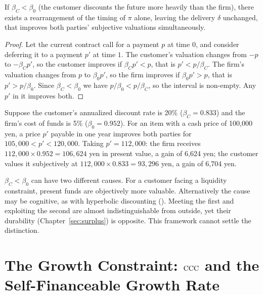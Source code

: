 \begin{proposition}
\label{prop:discount}
If $\beta_C<\beta_0$ (the customer discounts the future more heavily than the firm), there
exists a rearrangement of the timing of $\pi$ alone, leaving the delivery $\delta$ unchanged,
that improves both parties' subjective valuations simultaneously.
\end{proposition}

\begin{proof}
Let the current contract call for a payment $p$ at time $0$, and consider deferring it to a
payment $p'$ at time $1$. The customer's valuation changes from $-p$ to $-\beta_C p'$, so
the customer improves if $\beta_C p' < p$, that is $p' < p/\beta_C$. The firm's valuation
changes from $p$ to $\beta_0 p'$, so the firm improves if $\beta_0 p' > p$, that is
$p' > p/\beta_0$. Since $\beta_C<\beta_0$ we have $p/\beta_0 < p/\beta_C$, so the interval
is non-empty. Any $p'$ in it improves both.
\end{proof}

\begin{example}
Suppose the customer's annualized discount rate is 20\% ($\beta_C=0.833$) and the firm's cost
of funds is 5\% ($\beta_0=0.952$). For an item with a cash price of 100{,}000 yen, a price
$p'$ payable in one year improves both parties for $105{,}000 < p' < 120{,}000$. Taking
$p'=112{,}000$: the firm receives $112{,}000\times 0.952 = 106{,}624$ yen in present value,
a gain of 6{,}624 yen; the customer values it subjectively at
$112{,}000\times 0.833=93{,}296$ yen, a gain of 6{,}704 yen.
\end{example}

\begin{remark}
$\beta_C<\beta_0$ can have two different causes. For a customer facing a liquidity
constraint, present funds are objectively more valuable. Alternatively the cause may be
cognitive, as with hyperbolic discounting (\cite{laibson1997}). Meeting the first and
exploiting the second are almost indistinguishable from outside, yet their durability
(Chapter~\ref{sec:surplus}) is opposite. This framework cannot settle the distinction.
\end{remark}

\chapter{The Growth Constraint: \texorpdfstring{$\mathrm{CCC}$}{CCC} and the Self-Financeable Growth Rate}
\label{sec:growth}

